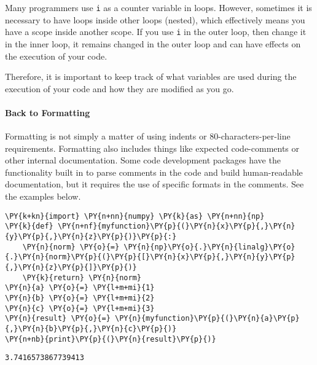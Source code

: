 Many programmers use \texttt{i} as a counter variable in loops. However,
sometimes it is necessary to have loops inside other loops (nested),
which effectively means you have a scope inside another scope. If you
use \texttt{i} in the outer loop, then change it in the inner loop, it
remains changed in the outer loop and can have effects on the execution
of your code.

Therefore, it is important to keep track of what variables are used
during the execution of your code and how they are modified as you go.

\hypertarget{back-to-formatting}{%
\paragraph{Back to Formatting}\label{back-to-formatting}}

Formatting is not simply a matter of using indents or
80-characters-per-line requirements. Formatting also includes things
like expected code-comments or other internal documentation. Some code
development packages have the functionality built in to parse comments
in the code and build human-readable documentation, but it requires the
use of specific formats in the comments. See the examples below.

    \begin{tcolorbox}[breakable, size=fbox, boxrule=1pt, pad at break*=1mm,colback=cellbackground, colframe=cellborder]
\begin{Verbatim}[commandchars=\\\{\}]
\PY{k+kn}{import} \PY{n+nn}{numpy} \PY{k}{as} \PY{n+nn}{np}
\PY{k}{def} \PY{n+nf}{myfunction}\PY{p}{(}\PY{n}{x}\PY{p}{,}\PY{n}{y}\PY{p}{,}\PY{n}{z}\PY{p}{)}\PY{p}{:}
    \PY{n}{norm} \PY{o}{=} \PY{n}{np}\PY{o}{.}\PY{n}{linalg}\PY{o}{.}\PY{n}{norm}\PY{p}{(}\PY{p}{[}\PY{n}{x}\PY{p}{,}\PY{n}{y}\PY{p}{,}\PY{n}{z}\PY{p}{]}\PY{p}{)}
    \PY{k}{return} \PY{n}{norm}
\PY{n}{a} \PY{o}{=} \PY{l+m+mi}{1}
\PY{n}{b} \PY{o}{=} \PY{l+m+mi}{2}
\PY{n}{c} \PY{o}{=} \PY{l+m+mi}{3}
\PY{n}{result} \PY{o}{=} \PY{n}{myfunction}\PY{p}{(}\PY{n}{a}\PY{p}{,}\PY{n}{b}\PY{p}{,}\PY{n}{c}\PY{p}{)}
\PY{n+nb}{print}\PY{p}{(}\PY{n}{result}\PY{p}{)}
\end{Verbatim}
\end{tcolorbox}

    \begin{Verbatim}[commandchars=\\\{\}]
3.7416573867739413
    \end{Verbatim}

